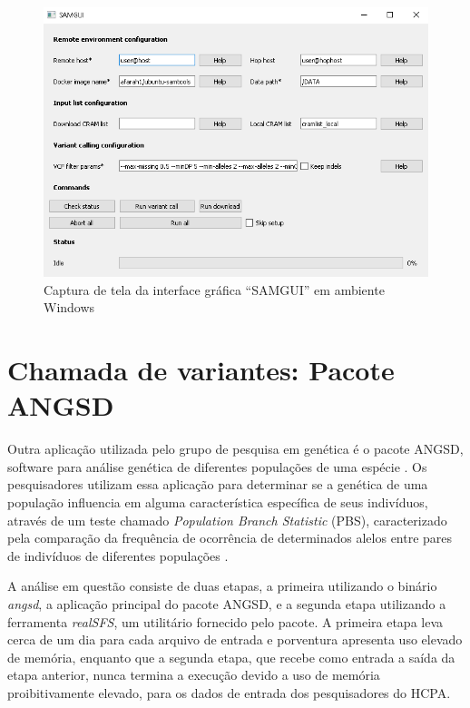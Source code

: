 \documentclass[cic,tc]{iiufrgs}
\begin{document}
\begin{figure}
  \caption{Captura de tela da interface gráfica ``SAMGUI'' em ambiente Windows}
    \begin{center}
      \includegraphics[width=0.85\linewidth]{img/samgui_windows.png}
    \end{center}
    \label{fig:samgui_windows}
\end{figure}

\section{Chamada de variantes: Pacote ANGSD}
\label{sec:angsd}

Outra aplicação utilizada pelo grupo de pesquisa em genética é o pacote ANGSD,
software para análise genética de diferentes populações de uma
espécie \cite{korneliussen2014angsd}. Os pesquisadores utilizam essa aplicação
para determinar se a genética de uma população influencia em alguma
característica específica de seus indivíduos, através de um teste chamado
\textit{Population Branch Statistic} (PBS), caracterizado pela comparação da
frequência de ocorrência de determinados alelos entre pares de
indivíduos de diferentes populações \cite{yi2010sequencing}.

A análise em questão consiste de duas etapas, a primeira utilizando o binário
\textit{angsd}, a aplicação principal do pacote ANGSD, e a segunda etapa utilizando a
ferramenta \textit{realSFS}, um utilitário fornecido pelo pacote. A primeira etapa leva
cerca de um dia para cada arquivo de entrada e porventura apresenta uso elevado
de memória, enquanto que a segunda etapa, que recebe como entrada a saída da
etapa anterior, nunca termina a execução devido a uso de memória
proibitivamente elevado, para os dados de entrada dos pesquisadores do HCPA.
\end{document}
